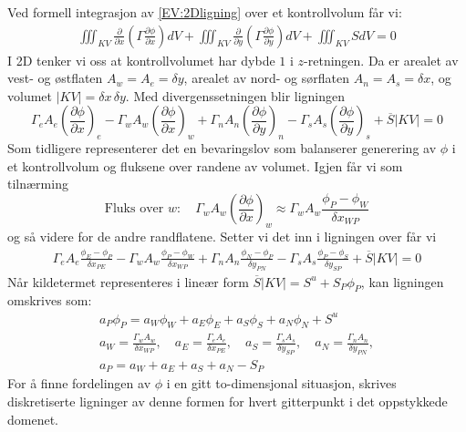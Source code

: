 Ved formell integrasjon av \eqref{EV:2Dligning} over et kontrollvolum får vi:
\begin{align}
\iiint_{KV} \frac{\partial}{\partial x} \left( \Gamma \frac{\partial \phi}{\partial x} \right) dV + \iiint_{KV} \frac{\partial}{\partial y} \left( \Gamma \frac{\partial \phi}{\partial y} \right) dV + \iiint_{KV} S dV = 0
\end{align}
I 2D tenker vi oss at kontrollvolumet har dybde $1$ i $z$-retningen. Da er arealet av vest- og østflaten $A_w = A_e = \delta y$, arealet av nord- og sørflaten $A_n = A_s = \delta x$, og volumet $|KV| = \delta x\,\delta y$. Med divergenssetningen blir ligningen
\[
\Gamma_e  A_e\left(\frac{\partial \phi}{\partial x}\right)_e - \Gamma_w A_w \left(\frac{\partial \phi}{\partial x}\right)_w  + \Gamma_n A_n\left(\frac{\partial \phi}{\partial y}\right)_n - \Gamma_s  A_s\left(\frac{\partial \phi}{\partial y}\right)_s  + \overline{S} |KV| = 0
\]
Som tidligere representerer det en bevaringslov som balanserer generering av $\phi $ i et kontrollvolum og fluksene over randene av volumet. Igjen får vi som tilnærming
\[\text{Fluks over }w: \quad \Gamma_w A_w \left(\frac{\partial \phi}{\partial x}\right)_w \approx \Gamma_w A_w\frac{\phi_P-\phi_W}{\delta x_{WP}}\]
og så videre for de andre randflatene. Setter vi det inn i ligningen over får vi
\begin{align}
\Gamma_e A_e \frac{\phi_E - \phi_P}{\delta x_{PE}} - \Gamma_w A_w \frac{\phi_P - \phi_W}{\delta x_{WP}} + \Gamma_n A_n \frac{\phi_N - \phi_P}{\delta y_{PN}} - \Gamma_s A_s \frac{\phi_P - \phi_S}{\delta y_{SP}} + \overline{S} |KV| = 0
\end{align}
Når kildetermet representeres i lineær form $\overline{S} |KV| = S^u + S_P \phi_P$, kan ligningen omskrives som:
\begin{align*}
a_P \phi_P = a_W \phi_W + a_E \phi_E + a_S \phi_S + a_N \phi_N + S^u\\
a_W = \frac{\Gamma_w A_w}{\delta x_{WP}}, \quad
a_E = \frac{\Gamma_e A_e}{\delta x_{PE}}, \quad
a_S = \frac{\Gamma_s A_s}{\delta y_{SP}}, \quad
a_N = \frac{\Gamma_n A_n}{\delta y_{PN}}, \\
a_P = a_W + a_E + a_S + a_N - S_P
\end{align*}
For å finne fordelingen av $\phi$ i en gitt to-dimensjonal situasjon, skrives diskretiserte ligninger av denne formen for hvert gitterpunkt i det oppstykkede domenet.

